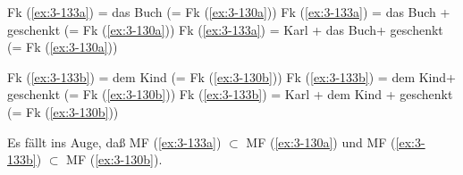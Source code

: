 \documentclass[output=paper]{langsci/langscibook}
\begin{document}
\begin{exe}
\ex
\label{ex:3-135}
\begin{xlist}
\ex
\label{ex:3-135a}
Fk (\ref{ex:3-133a}) = das Buch (= Fk (\ref{ex:3-130a}))
\ex
\label{ex:3-135b}
Fk (\ref{ex:3-133a}) = das Buch + geschenkt (= Fk (\ref{ex:3-130a}))
\ex
\label{ex:3-135c}
Fk (\ref{ex:3-133a}) = Karl + das Buch+ geschenkt (= Fk (\ref{ex:3-130a}))
\end{xlist}
\ex
\label{ex:3-136}
\begin{xlist}
\ex
\label{ex:3-136a}
Fk (\ref{ex:3-133b}) = dem Kind (= Fk (\ref{ex:3-130b}))
\ex
\label{ex:3-136b}
Fk (\ref{ex:3-133b}) = dem Kind+ geschenkt (= Fk (\ref{ex:3-130b}))
\ex
\label{ex:3-136c}
Fk (\ref{ex:3-133b}) = Karl + dem Kind + geschenkt (= Fk (\ref{ex:3-130b}))
\end{xlist}
\end{exe}
Es fällt ins Auge, daß MF (\ref{ex:3-133a}) $\subset$ MF (\ref{ex:3-130a}) und MF (\ref{ex:3-133b}) $\subset$ MF (\ref{ex:3-130b}). 
\end{document}
